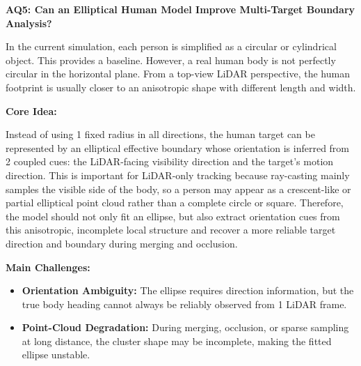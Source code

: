 \documentclass[11pt,a4paper]{report}
\newcommand{\boxitemtitle}[1]{
    \vspace{0.5em}
    {\large\textbf{\color{DeepBlue} #1}}\par
    \vspace{0.8em}
}
\begin{document}
\newpage
\boxitemtitle{AQ5: Can an Elliptical Human Model Improve Multi-Target Boundary Analysis?}
\begin{contentbox}
In the current simulation, each person is simplified as a circular or cylindrical object. This provides a baseline. However, a real human body is not perfectly circular in the horizontal plane. From a top-view LiDAR perspective, the human footprint is usually closer to an anisotropic shape with different length and width.

\vspace{1.0em}
\textbf{Core Idea:}

Instead of using 1 fixed radius in all directions, the human target can be represented by an elliptical effective boundary whose orientation is inferred from 2 coupled cues: the LiDAR-facing visibility direction and the target's motion direction. This is important for LiDAR-only tracking because ray-casting mainly samples the visible side of the body, so a person may appear as a crescent-like or partial elliptical point cloud rather than a complete circle or square. Therefore, the model should not only fit an ellipse, but also extract orientation cues from this anisotropic, incomplete local structure and recover a more reliable target direction and boundary during merging and occlusion.

\vspace{0.8em}
\textbf{Main Challenges:}
\begin{itemize}[leftmargin=*]
    \item \textbf{Orientation Ambiguity:} The ellipse requires direction information, but the true body heading cannot always be reliably observed from 1 LiDAR frame.
    \item \textbf{Point-Cloud Degradation:} During merging, occlusion, or sparse sampling at long distance, the cluster shape may be incomplete, making the fitted ellipse unstable.
\end{itemize}
\end{contentbox}
\end{document}
